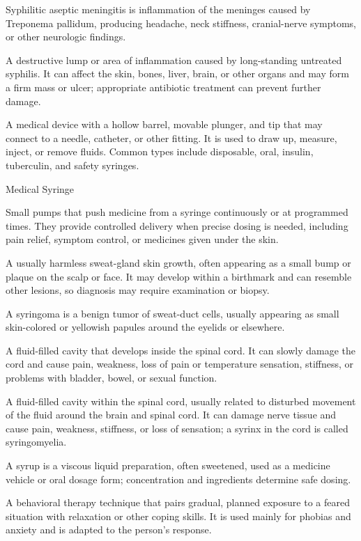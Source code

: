  Syphilitic aseptic meningitis is inflammation of the meninges caused by Treponema pallidum, producing headache, neck stiffness, cranial-nerve symptoms, or other neurologic findings.

 A destructive lump or area of inflammation caused by long-standing untreated syphilis. It can affect the skin, bones, liver, brain, or other organs and may form a firm mass or ulcer; appropriate antibiotic treatment can prevent further damage.

 A medical device with a hollow barrel, movable plunger, and tip that may connect to a needle, catheter, or other fitting. It is used to draw up, measure, inject, or remove fluids. Common types include disposable, oral, insulin, tuberculin, and safety syringes.

\synonyms
Medical Syringe

 Small pumps that push medicine from a syringe continuously or at programmed times. They provide controlled delivery when precise dosing is needed, including pain relief, symptom control, or medicines given under the skin.

 A usually harmless sweat-gland skin growth, often appearing as a small bump or plaque on the scalp or face. It may develop within a birthmark and can resemble other lesions, so diagnosis may require examination or biopsy.

 A syringoma is a benign tumor of sweat-duct cells, usually appearing as small skin-colored or yellowish papules around the eyelids or elsewhere.

 A fluid-filled cavity that develops inside the spinal cord. It can slowly damage the cord and cause pain, weakness, loss of pain or temperature sensation, stiffness, or problems with bladder, bowel, or sexual function.

 A fluid-filled cavity within the spinal cord, usually related to disturbed movement of the fluid around the brain and spinal cord. It can damage nerve tissue and cause pain, weakness, stiffness, or loss of sensation; a syrinx in the cord is called syringomyelia.

 A syrup is a viscous liquid preparation, often sweetened, used as a medicine vehicle or oral dosage form; concentration and ingredients determine safe dosing.

 A behavioral therapy technique that pairs gradual, planned exposure to a feared situation with relaxation or other coping skills. It is used mainly for phobias and anxiety and is adapted to the person’s response.

